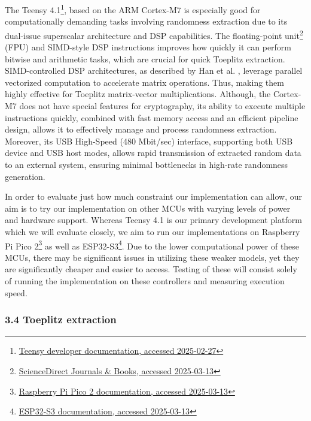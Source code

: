 The Teensy 4.1\footnote{\href{https://www.pjrc.com/store/teensy41.html}{Teensy developer documentation, accessed 2025-02-27}}, based on the ARM Cortex-M7 is especially good for computationally demanding tasks involving randomness extraction due to its dual-issue superscalar architecture and DSP capabilities. The floating-point unit\footnote{\href{https://www.sciencedirect.com/topics/computer-science/floating-point-unit}{ScienceDirect Journals \& Books, accessed 2025-03-13}} (FPU) and SIMD-style DSP instructions improves how quickly it can perform bitwise and arithmetic tasks, which are crucial for quick Toeplitz extraction. SIMD-controlled DSP architectures, as described by Han et al. \cite{simd-dsp}, leverage parallel vectorized computation to accelerate matrix operations. Thus, making them highly effective for Toeplitz matrix-vector multiplications. Although, the Cortex-M7 does not have special features for cryptography, its ability to execute multiple instructions quickly, combined with fast memory access and an efficient pipeline design, allows it to effectively manage and process randomness extraction. Moreover, its USB High-Speed (480 Mbit/sec) interface, supporting both USB device and USB host modes, allows rapid transmission of extracted random data to an external system, ensuring minimal bottlenecks in high-rate randomness generation.

In order to evaluate just how much constraint our implementation can allow, our aim is to try our implementation on other MCUs with varying levels of power and hardware support. Whereas Teensy 4.1 is our primary development platform which we will evaluate closely, we aim to run our implementations on Raspberry Pi Pico 2\footnote{\href{https://datasheets.raspberrypi.com/pico/pico-2-product-brief.pdf}{Raspberry Pi Pico 2 documentation, accessed 2025-03-13}} as well as ESP32-S3\footnote{\href{https://www.espressif.com/sites/default/files/documentation/esp32-s3_datasheet_en.pdf}{ESP32-S3 documentation, accessed 2025-03-13}}. Due to the lower computational power of these MCUs, there may be significant issues in utilizing these weaker models, yet they are significantly cheaper and easier to access. Testing of these will consist solely of running the implementation on these controllers and measuring execution speed.

\subsubsection{\texorpdfstring{3.4 Toeplitz extraction }{3.4 Toeplitz extraction }}\label{toeplitz-extraction}

